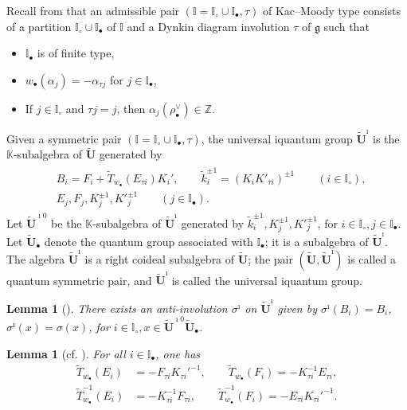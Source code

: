 \documentclass[a4paper,reqno,12pt]{amsart}
\numberwithin{equation}{section}
\newtheorem{lemma}[proposition]{Lemma}
\theoremstyle{definition}
\theoremstyle{plain}
\theoremstyle{definition}
\def\fg{\mathfrak g}
\def\K{\mathbb K}
\def\Z{\mathbb Z}
\def\I{\mathbb I}
\def\bI{\I_\bullet}
\def\wI{\I_\circ}
\def\bw{w_\bullet}
\def\tU{\widetilde{\mathbf U}}
\def\tUi{\widetilde{\mathbf U}^{\imath}}
\def \tbU{\tU_{\bullet}}
\def\tTD{\widetilde T}
\def\tk{\widetilde k}
\begin{document}
Recall from \cite[Definition 2.3]{Ko14} that an admissible pair $(\I=\wI\cup \bI,\tau)$ of Kac--Moody type consists of a partition $\wI\cup \bI$ of $\I$ and a Dynkin diagram involution $\tau$ of $\fg$ such that
\begin{itemize}
\item[(1)] $\bI$ is of finite type,

\item[(2)]
 $\bw(\alpha_j) = - \alpha_{\tau j}$ for $j\in \bI$,
\item[(3)]
 If $j\in \wI$ and $\tau j =j$, then $\alpha_j(\rho_{\bullet}^\vee)\in \Z$.
\end{itemize}

Given a symmetric pair $(\I=\wI\cup\bI,\tau )$, the universal iquantum group $\tUi$ is the $\K$-subalgebra of $\tU$ generated by
	\begin{align}
\label{def:iQG}
\begin{split}
&B_i=F_i+\tTD_{\bw}( E_{\tau i}) K_i', \qquad \tk_i^{\pm1}=(K_i K'_{\tau i})^{\pm1} \qquad (i\in \wI),
\\
&E_j,F_j,K_j^{\pm1},K'^{\pm1}_j\qquad (j\in \bI).
\end{split}
\end{align}
 Let $\tU^{\imath 0}$ be the $\K$-subalgebra of $\tUi$ generated by $\tk_i^{\pm1},K_j^{\pm1},K'^{\pm1}_j$, for $i\in \wI,j\in\bI$. Let $\tbU$ denote the quantum group associated with $\bI$; it is a subalgebra of $\tUi$.
The algebra $\tUi$ is a right coideal subalgebra of $\tU$; the pair $(\tU,\tUi)$ is called a quantum symmetric pair, and $\tUi$ is called the universal iquantum group.
\begin{lemma}[{\cite[Proposition 3.12]{WZ23}}]
There exists an anti-involution $\sigma^\imath$ on $\tUi$ given by $\sigma^\imath(B_i)=B_i$, $\sigma^\imath(x)=\sigma(x)$, for $i\in\wI,x\in\tU^{\imath 0}\tbU$.  
\end{lemma}

\begin{lemma}[cf. {\cite[Lemma 3.4]{Ko14}}]\label{lem:Tw-on-X} 
 For all $i\in \I_\bullet$, one has
  \begin{align*}
    \tTD_{w_\bullet}(E_i)&=-F_{\tau i} K_{\tau i}'^{-1},\qquad
    \tTD_{w_\bullet}(F_i)=-K_{\tau i}^{-1}E_{\tau i},\\
    \tTD_{w_\bullet}^{-1}(E_i)&=-K_{\tau i}^{-1} F_{\tau i},\qquad
    \tTD_{w_\bullet}^{-1}(F_i)=-E_{\tau i} K_{\tau i}'^{-1}.
  \end{align*}
\end{lemma}
\end{document}
